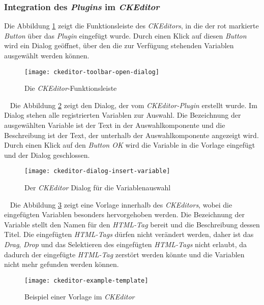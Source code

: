 \subsubsection{Integration des \emph{Plugins} im \emph{CKEditor}}
Die Abbildung \ref{fig:ckeditor-toolbar-opne-dialog} zeigt die Funktionsleiste des \emph{CKEditors}, in die der rot markierte \emph{Button} über das \emph{Plugin} eingefügt wurde. Durch einen Klick auf diesen \emph{Button} wird ein Dialog geöffnet, über den die zur Verfügung stehenden Variablen ausgewählt werden können.
\begin{figure}[h]
\centering
\texttt{[image: ckeditor-toolbar-open-dialog]}
\caption{Die \emph{CKEditor}-Funktionsleiste}
\label{fig:ckeditor-toolbar-opne-dialog}
\end{figure}
\ \newline
Die Abbildung \ref{fig:ckeditor-dialog-insert-variable} zeigt den Dialog, der vom \emph{CKEditor-Plugin} erstellt wurde. Im Dialog stehen alle registrierten Variablen zur Auswahl. Die Bezeichnung der ausgewählten Variable ist der Text in der Auswahlkomponente und die Beschreibung ist der Text, der unterhalb der Auswahlkomponente angezeigt wird. Durch einen Klick auf den \emph{Button OK} wird die Variable in die Vorlage eingefügt und der Dialog  geschlossen.
\begin{figure}[h]
\centering
\texttt{[image: ckeditor-dialog-insert-variable]}
\caption{Der \emph{CKEditor} Dialog für die Variablenauswahl}
\label{fig:ckeditor-dialog-insert-variable}
\end{figure}
\ \newline
Die Abbildung \ref{fig:ckeditor-example-template} zeigt eine Vorlage innerhalb des \emph{CKEditors}, wobei die eingefügten Variablen besonders hervorgehoben werden. Die Bezeichnung  der Variable stellt den Namen für den \emph{HTML-Tag} bereit und die Beschreibung dessen Titel. Die eingefügten \emph{HTML-Tags} dürfen nicht verändert werden, daher ist das \emph{Drag}, \emph{Drop} und das Selektieren des eingefügten \emph{HTML-Tags} nicht erlaubt, da dadurch der eingefügte \emph{HTML-Tag} zerstört werden könnte und die Variablen nicht mehr gefunden werden können.
\begin{figure}[h]
\centering
\texttt{[image: ckeditor-example-template]}
\caption{Beispiel einer Vorlage im \emph{CKEditor}}
\label{fig:ckeditor-example-template}
\end{figure}

